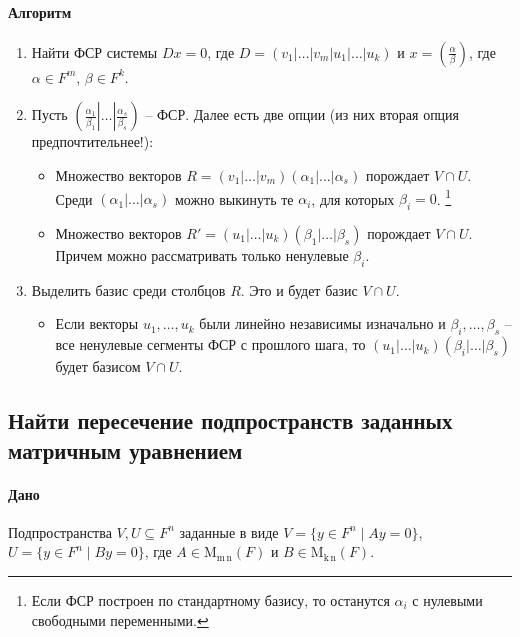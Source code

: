\documentclass{article}
\newcommand{\MatrixDim}[3]{\operatorname{\mathrm{M}_{#2\,#3}}(#1)}
\begin{document}
\paragraph{Алгоритм}

\begin{enumerate}
\item Найти ФСР системы $D x = 0$, где $D = (v_1|\ldots|v_m|u_1|\ldots|u_k)$ и $x = \left(\frac{\alpha}{\beta}\right)$, где $\alpha\in F^{m}$, $\beta\in F^{k}$.

\item Пусть $\left(\left.\left.\frac{\alpha_1}{\beta_1}\right|\ldots\right|\frac{\alpha_s}{\beta_s}\right)$ -- ФСР.
Далее есть две опции (из них вторая опция предпочтительнее!):
\begin{itemize}
\item Множество векторов $R = (v_1|\ldots|v_m)(\alpha_1|\ldots|\alpha_s)$ порождает $V\cap U$.
Среди $(\alpha_1|\ldots|\alpha_s)$ можно выкинуть те $\alpha_i$, для которых $\beta_i = 0$.%
\footnote{Если ФСР построен по стандартному базису, то останутся $\alpha_i$ с нулевыми свободными переменными.}

\item Множество векторов $R' = (u_1|\ldots|u_k)(\beta_1|\ldots|\beta_s)$ порождает  $V\cap U$.
Причем можно рассматривать только ненулевые $\beta_i$.
\end{itemize}

\item Выделить базис среди столбцов $R$.
Это и будет базис $V\cap U$.
\begin{itemize}
\item Если векторы $u_1,\ldots,u_k$ были линейно независимы изначально и $\beta_i,\ldots,\beta_s$ -- все ненулевые сегменты ФСР с прошлого шага, то $(u_1|\ldots|u_k)(\beta_i|\ldots|\beta_s)$ будет базисом $V\cap U$.
\end{itemize}
\end{enumerate}

\subsection{Найти пересечение подпространств заданных матричным уравнением}

\paragraph{Дано}

Подпространства $V,U\subseteq F^{n}$ заданные в виде $V = \{y\in F^{n}\mid Ay = 0\}$, $U = \{y\in F^{n}\mid By = 0\}$, где $A\in \MatrixDim{F}{m}{n}$ и $B\in \MatrixDim{F}{k}{n}$.
\end{document}
